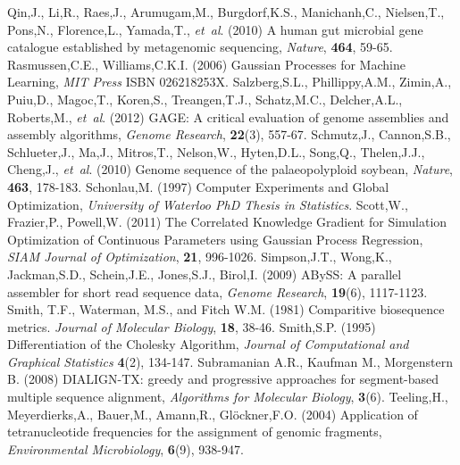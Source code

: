 \documentclass[phd,tocprelim]{cornell}
\begin{document}
\begin{thebibliography}{}
 Qin,J., Li,R., Raes,J., Arumugam,M., Burgdorf,K.S., Manichanh,C., Nielsen,T., Pons,N., Florence,L., Yamada,T., {\it et~al}. (2010) A human gut microbial gene catalogue established by metagenomic sequencing, {\it Nature}, {\bf 464}, 59-65.
 Rasmussen,C.E., Williams,C.K.I. (2006) Gaussian Processes for Machine Learning, {\it MIT Press} ISBN 026218253X.
 Salzberg,S.L., Phillippy,A.M., Zimin,A., Puiu,D., Magoc,T., Koren,S., Treangen,T.J., Schatz,M.C., Delcher,A.L., Roberts,M., {\it et~al}. (2012)  GAGE: A critical evaluation of genome assemblies and assembly algorithms, {\it Genome Research}, {\bf 22}(3), 557-67.
 Schmutz,J., Cannon,S.B., Schlueter,J., Ma,J., Mitros,T., Nelson,W., Hyten,D.L., Song,Q., Thelen,J.J., Cheng,J., {\it et~al}. (2010) Genome sequence of the palaeopolyploid soybean, {\it Nature}, {\bf 463}, 178-183.
 Schonlau,M. (1997) Computer Experiments and Global Optimization, {\it University of Waterloo PhD Thesis in Statistics}.
 Scott,W., Frazier,P., Powell,W. (2011) The Correlated Knowledge Gradient for Simulation Optimization of Continuous Parameters using Gaussian Process Regression, {\it SIAM Journal of Optimization}, {\bf 21}, 996-1026.
 Simpson,J.T., Wong,K., Jackman,S.D., Schein,J.E., Jones,S.J., Birol,I. (2009) ABySS: A parallel assembler for short read sequence data, {\it Genome Research}, {\bf 19}(6), 1117-1123.
Smith, T.F., Waterman, M.S., and Fitch W.M. (1981) Comparitive biosequence metrics. \textit{Journal of Molecular Biology}, \textbf{18}, 38-46.
 Smith,S.P. (1995) Differentiation of the Cholesky Algorithm, {\it Journal of Computational and Graphical Statistics} {\bf 4}(2), 134-147.
Subramanian A.R., Kaufman M., Morgenstern B. (2008) DIALIGN-TX: greedy and progressive approaches for segment-based multiple sequence alignment, {\it Algorithms for Molecular Biology}, {\bf 3}(6).
 Teeling,H., Meyerdierks,A., Bauer,M., Amann,R., Glöckner,F.O. (2004) Application of tetranucleotide frequencies for the assignment of genomic fragments, {\it Environmental Microbiology}, {\bf 6}(9), 938-947.

\end{thebibliography}
\end{document}
